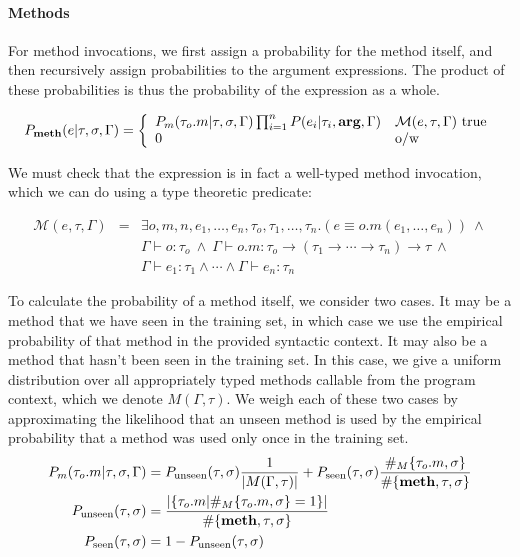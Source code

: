 \documentclass{article} %
\begin{document}
\paragraph{Methods} For method invocations, we first assign a probability for the method itself, and then recursively assign probabilities to the argument expressions. The product of these probabilities is thus the probability of the expression as a whole.

$$P_{\textbf{meth}}(e | \tau, \sigma, \Gamma) = 
\left\{
	\begin{array}{ll}
          P_m(\tau_o.m | \tau, \sigma, \Gamma) \prod_{i=1}^n P(e_i | \tau_i, \textbf{arg}, \Gamma)  & \mathcal{M}(e, \tau, \Gamma)\mbox{ true} \\
	0 & \mbox{o/w}
	\end{array}
\right.$$

We must check that the expression is in fact a well-typed method invocation, which we can do using a type theoretic predicate:

$$\begin{array}{lll}
\mathcal{M}(e, \tau, \Gamma) & = & \exists o, m, n, e_1, \ldots, e_n, \tau_o, \tau_1, \ldots, \tau_n. (e \equiv o.m(e_1, \ldots, e_n))~\land\\
 & & 
\Gamma \vdash o : \tau_o~\land~\Gamma \vdash o.m : \tau_o \rightarrow (\tau_1 \rightarrow \cdots \rightarrow \tau_n) \rightarrow \tau~\land~\\
 & & \Gamma \vdash e_1 : \tau_1 \land \cdots \land \Gamma \vdash e_n : \tau_n
\end{array}$$

To calculate the probability of a method itself, we consider two cases. It may be a method that we have seen in the training set, in which case we use the empirical probability of that method in the provided syntactic context. It may also be a method that hasn't been seen in the training set. In this case, we give a uniform distribution over all appropriately typed methods callable from the program context, which we denote $M(\Gamma, \tau)$. We weigh each of these two cases by approximating the likelihood that an unseen method is used by the empirical probability that a method was used only once in the training set.
\begin{align*}
P_m(\tau_o.m | \tau, \sigma, \Gamma) & =  P_{\text{unseen}}(\tau, \sigma)\frac{1}{|M(\Gamma, \tau)|} + 
P_{\text{seen}}(\tau, \sigma)\frac{\#_M\{\tau_o.m, \sigma\}}{\#\{\textbf{meth}, \tau, \sigma\}}\\
P_{\text{unseen}}(\tau, \sigma) & =  \frac{ |\{\tau_o.m | \#_M\{\tau_o.m, \sigma\} = 1\}|}{\#\{\textbf{meth}, \tau, \sigma\}}\\
P_{\text{seen}}(\tau, \sigma) & =  1 - P_{\text{unseen}}(\tau, \sigma)
\end{align*}
\end{document}

